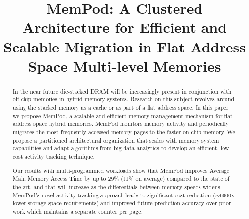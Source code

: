 \documentclass{sig-alternate}
\title {MemPod: A Clustered Architecture for Efficient and Scalable Migration in Flat Address Space Multi-level Memories}
\author{}
\begin{document}
\maketitle
\thispagestyle{firstpage}
\pagestyle{plain}

\begin{abstract}

%

In the near future die-stacked DRAM will be increasingly
present in conjunction with 
off-chip memories in hybrid memory systems. Research on this subject revolves around using the stacked memory as a cache or as part of a flat address space. In this paper we propose MemPod, a scalable and efficient memory management mechanism for flat address space hybrid memories. MemPod monitors memory activity and periodically migrates the most frequently accessed memory pages to the faster on-chip memory. We propose a partitioned architectural organization that scales with memory system capabilities and adapt algorithms from big data analytics to develop an efficient, low-cost activity tracking technique. 

Our results with multi-programmed workloads show that MemPod improves Average Main Memory Access Time by up to 29\% (11\% on average) compared to the state of the art, and that will increase as the differentials between memory speeds
widens.
MemPod's novel activity tracking approach leads to significant cost reduction ($\sim$6000x lower storage space requirements) and improved future prediction accuracy over prior work which maintains a separate counter per page.

\end{abstract}
\end{document}
